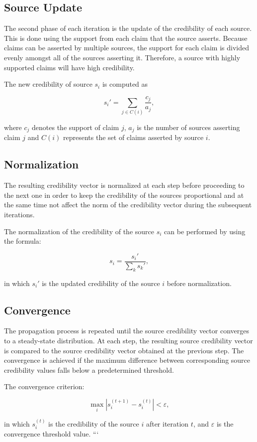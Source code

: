 \subsection{Source Update}

The second phase of each iteration is the update of the credibility of each source. This is done using the support from each claim that the source asserts. Because claims can be asserted by multiple sources, the support for each claim is divided evenly amongst all of the sources asserting it. Therefore, a source with highly supported claims will have high credibility.

The new credibility of source $s_i$ is computed as

\begin{equation}
s_i' =
\sum_{j \in C(i)}
\frac{c_j}{a_j},
\label{eq:source-update}
\end{equation}

where $c_j$ denotes the support of claim $j$, $a_j$ is the number of sources asserting claim $j$ and $C(i)$ represents the set of claims asserted by source $i$.

\subsection{Normalization}

The resulting credibility vector is normalized at each step before proceeding to the next one in order to keep the credibility of the sources proportional and at the same time not affect the norm of the credibility vector during the subsequent iterations.

The normalization of the credibility of the source $s_i$ can be performed by using the formula:

\begin{equation}
s_i =
\frac{s_i'}{\sum_{k} s_k'},
\label{eq:normalization}
\end{equation}

in which $s_i'$ is the updated credibility of the source $i$ before normalization.

\subsection{Convergence}

The propagation process is repeated until the source credibility vector converges to a steady-state distribution. At each step, the resulting source credibility vector is compared to the source credibility vector obtained at the previous step. The convergence is achieved if the maximum difference between corresponding source credibility values falls below a predetermined threshold.

The convergence criterion:

\begin{equation}
\max_i
\left|
s_i^{(t+1)}
-
s_i^{(t)}
\right|
<
\varepsilon,
\label{eq:convergence}
\end{equation}

in which $s_i^{(t)}$ is the credibility of the source $i$ after iteration $t$, and $\varepsilon$ is the convergence threshold value.
```